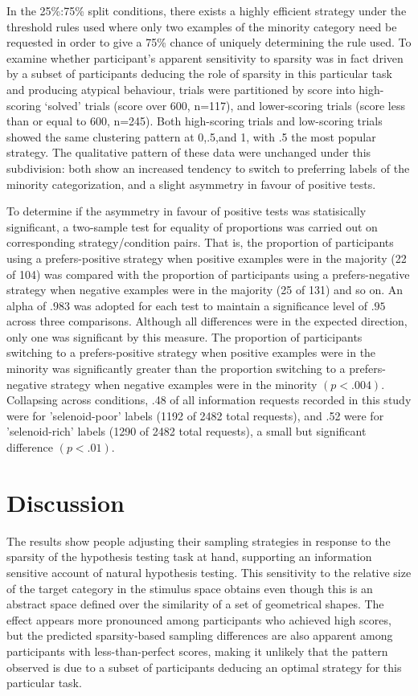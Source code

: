 \documentclass[10pt,letterpaper]{article}
\begin{document}
In the 25\%:75\% split conditions, there exists a highly efficient strategy under the threshold rules used where only two examples of the minority category need be requested in order to give a 75\% chance of uniquely determining the rule used. To examine whether participant's apparent sensitivity to sparsity was in fact driven by a subset of participants deducing the role of sparsity in this particular task and producing atypical behaviour, trials were partitioned by score into high-scoring `solved' trials (score over 600, n=117), and lower-scoring trials (score less than or equal to 600, n=245). Both high-scoring trials and low-scoring trials showed the same clustering pattern at 0,.5,and 1, with .5 the most popular strategy. The qualitative pattern of these data were unchanged under this subdivision: both show an increased tendency to switch to preferring labels of the minority categorization, and a slight asymmetry in favour of positive tests.

To determine if the asymmetry in favour of positive tests was statisically significant, a two-sample test for equality of proportions was carried out on corresponding strategy/condition pairs. That is, the proportion of participants using a prefers-positive strategy when positive examples were in the majority (22 of 104) was compared with the proportion of participants using a prefers-negative strategy when negative examples were in the majority (25 of 131) and so on. An alpha of $.983$ was adopted for each test to maintain a significance level of $.95$ across three comparisons. Although all differences were in the expected direction, only one was significant by this measure. The proportion of participants switching to a prefers-positive strategy when positive examples were in the minority was significantly greater than the proportion switching to a prefers-negative strategy when negative examples were in the minority $(p<.004)$. Collapsing across conditions, .48 of all information requests recorded in this study were for 'selenoid-poor' labels (1192 of 2482 total requests), and .52 were for 'selenoid-rich' labels (1290 of 2482 total requests), a small but significant difference $(p<.01)$.

\section{Discussion}
The results show people adjusting their sampling strategies in response to the sparsity of the hypothesis testing task at hand, supporting an information sensitive account of natural hypothesis testing\cite{navarro2011sparsecat}. This sensitivity to the relative size of the target category in the stimulus space obtains even though this is an abstract space defined over the similarity of a set of geometrical shapes. The effect appears more pronounced among participants who achieved high scores, but the predicted sparsity-based sampling differences are also apparent among participants with less-than-perfect scores, making it unlikely that the pattern observed is due to a subset of participants deducing an optimal strategy for this particular task. %
\end{document}

